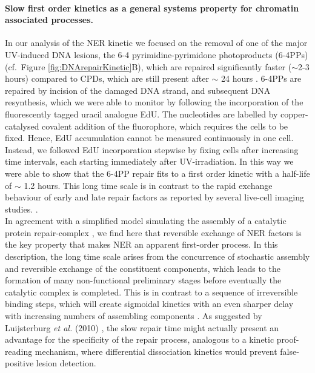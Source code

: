 \paragraph{Slow first order kinetics as a general systems property for chromatin associated processes.}
In our analysis of the NER kinetic we focused on the removal of one of the major UV-induced DNA lesions, the 6-4 pyrimidine-pyrimidone photoproducts (6-4PPs) (cf.\ Figure \ref{fig:DNArepairKinetic}B), which are repaired significantly faster ($\sim$2-3 hours) compared to CPDs, which are still present after $\sim$ 24 hours \cite{Smerdon1978,vanHoffen:1995:EMBO-J:7835346,Luijsterburg2010}. 6-4PPs are repaired by incision of the damaged DNA strand, and subsequent DNA resynthesis, which we were able to monitor by following the incorporation of the fluorescently tagged uracil analogue EdU. The nucleotides are labelled by copper-catalysed covalent addition of the fluorophore, which requires the cells to be fixed. Hence, EdU accumulation cannot be measured continuously in one cell. Instead, we followed EdU incorporation stepwise by fixing cells after increasing time intervals, each starting immediately after UV-irradiation. In this way we were able to show that the 6-4PP repair fits to a first order kinetic with a half-life of $\sim$ 1.2 hours.         
This long time scale is in contrast to the rapid exchange behaviour of early and late repair factors as reported by several live-cell imaging studies. \cite{Houtsmuller1999,Volker2001,Hoogstraten2002,Rademakers2003,Mone2004,Zotter2006,Hoogstraten2008,Luijsterburg2010}. \\
In agreement with a simplified model simulating the assembly of a catalytic protein repair-complex \cite{Terstiege2010}, we find here that reversible exchange of NER factors is the key property that makes NER an apparent first-order process. In this description, the long time scale arises from the concurrence of stochastic assembly and reversible exchange of the constituent components, which leads to the formation of many non-functional preliminary stages before eventually the catalytic complex is completed. This is in contrast to a sequence of irreversible binding steps, which will create sigmoidal kinetics with an even sharper delay with increasing numbers of assembling components \cite{Terstiege2010}. As suggested by Luijsterburg \textit{et al.} (2010) \cite{Luijsterburg2010}, the slow repair time might actually present an advantage for the specificity of the repair process, analogous to a kinetic proof-reading mechanism, where differential dissociation kinetics would prevent false-positive lesion detection. \\ 
